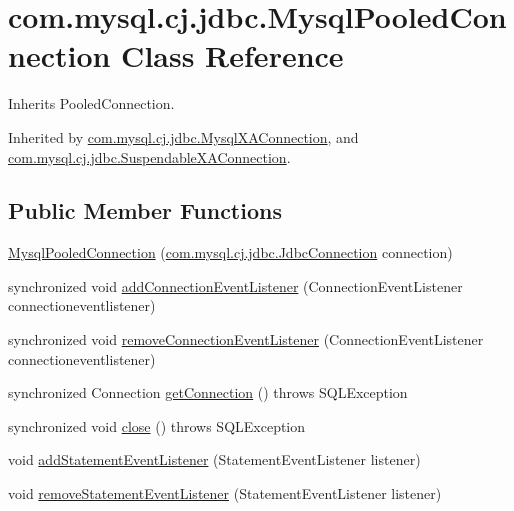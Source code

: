 \hypertarget{classcom_1_1mysql_1_1cj_1_1jdbc_1_1_mysql_pooled_connection}{}\section{com.\+mysql.\+cj.\+jdbc.\+Mysql\+Pooled\+Connection Class Reference}
\label{classcom_1_1mysql_1_1cj_1_1jdbc_1_1_mysql_pooled_connection}


Inherits Pooled\+Connection.



Inherited by \mbox{\hyperlink{classcom_1_1mysql_1_1cj_1_1jdbc_1_1_mysql_x_a_connection}{com.\+mysql.\+cj.\+jdbc.\+Mysql\+X\+A\+Connection}}, and \mbox{\hyperlink{classcom_1_1mysql_1_1cj_1_1jdbc_1_1_suspendable_x_a_connection}{com.\+mysql.\+cj.\+jdbc.\+Suspendable\+X\+A\+Connection}}.

\subsection*{Public Member Functions}
\begin{DoxyCompactItemize}
\item 
\mbox{\hyperlink{classcom_1_1mysql_1_1cj_1_1jdbc_1_1_mysql_pooled_connection_a43cdb60be4556fa920df1f9825251e34}{Mysql\+Pooled\+Connection}} (\mbox{\hyperlink{interfacecom_1_1mysql_1_1cj_1_1jdbc_1_1_jdbc_connection}{com.\+mysql.\+cj.\+jdbc.\+Jdbc\+Connection}} connection)
\item 
synchronized void \mbox{\hyperlink{classcom_1_1mysql_1_1cj_1_1jdbc_1_1_mysql_pooled_connection_a78b602d37e0fa7a264bf701a20b0a524}{add\+Connection\+Event\+Listener}} (Connection\+Event\+Listener connectioneventlistener)
\item 
synchronized void \mbox{\hyperlink{classcom_1_1mysql_1_1cj_1_1jdbc_1_1_mysql_pooled_connection_a04e5a3da33510961ae371ab051926e9f}{remove\+Connection\+Event\+Listener}} (Connection\+Event\+Listener connectioneventlistener)
\item 
synchronized Connection \mbox{\hyperlink{classcom_1_1mysql_1_1cj_1_1jdbc_1_1_mysql_pooled_connection_a0aa675b4e16ec148099680b9651d90e7}{get\+Connection}} ()  throws S\+Q\+L\+Exception 
\item 
synchronized void \mbox{\hyperlink{classcom_1_1mysql_1_1cj_1_1jdbc_1_1_mysql_pooled_connection_aea456ba604e6a1a157182698ab58b2ef}{close}} ()  throws S\+Q\+L\+Exception 
\item 
void \mbox{\hyperlink{classcom_1_1mysql_1_1cj_1_1jdbc_1_1_mysql_pooled_connection_aa2d07be72ad7852dec58ce9c5e32f7da}{add\+Statement\+Event\+Listener}} (Statement\+Event\+Listener listener)
\item 
void \mbox{\hyperlink{classcom_1_1mysql_1_1cj_1_1jdbc_1_1_mysql_pooled_connection_a9f58a333cb514007a999c93879dcfe51}{remove\+Statement\+Event\+Listener}} (Statement\+Event\+Listener listener)
\end{DoxyCompactItemize}
